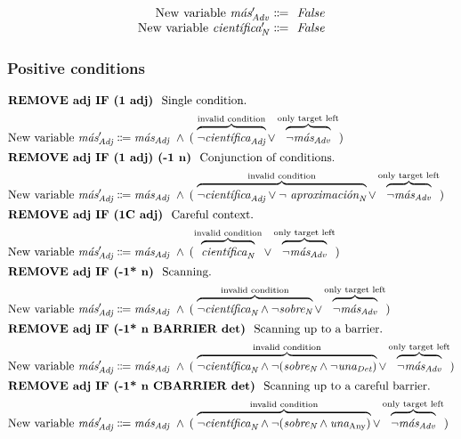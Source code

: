 \begin{equation}
\begin{array}{r @{~\eqdef~} l}
    \text{New variable } \mas{}'_\adv      & \text{ \em False} \\
    \text{New variable } \cientifica{}'_\n & \text{ \em False} \\
\end{array}
\label{eq:slAdjOrdered}
\end{equation}



\subsubsection{Positive conditions}

\def\invConds{\text{invalid condition}}
\def\onlyTrgLeft{\text{only target left}}

\begin{align}
%
\intertext{\cgrule{REMOVE adj IF (1 adj)} Single condition.} 
\text{New variable } \mas{}'_\adj 
      & \eqdef \masAdj\ 
        \wedge\: ( \; \ob{\neg\cientificaAdj}^{\invConds} 
        \vee  \ob{\neg\masAdv}^{\onlyTrgLeft} ) \\
%
%
\intertext{\cgrule{REMOVE adj IF (1 adj) (-1 n)} Conjunction of conditions.}
\text{New variable } \mas{}'_\adj 
      & \eqdef \masAdj\ 
       \wedge\: ( \; \ob{\neg\cientificaAdj \vee \neg\aproximacionN}^{\invConds} 
       \vee  \ob{\neg\masAdv}^{\onlyTrgLeft} ) \\
%
%
\intertext{\cgrule{REMOVE adj IF (1C adj)} Careful context.} %
  \text{New variable } \mas{}'_\adj 
     & \eqdef \masAdj\ 
     \wedge\: ( \ob{\cientificaN}^{\invConds} 
     \vee \ob{\neg\masAdv}^{\onlyTrgLeft}  ) \\
%
%
\intertext{\cgrule{REMOVE adj IF (-1* n)} Scanning.}
  \text{New variable } \mas{}'_\adj 
     & \eqdef \masAdj\ 
     \wedge\: ( \; \ob{\neg\cientificaN \wedge \neg\sobreN}^{\invConds} 
     \vee \ob{\neg\masAdv}^{\onlyTrgLeft} ) \\
%
%
\intertext{\cgrule{REMOVE adj IF (-1* n BARRIER det)} Scanning up to a barrier. }
  \text{New variable } \mas{}'_\adj 
     & \eqdef \masAdj\ 
     \wedge\: ( \; \ob{\neg\cientificaN \wedge \neg(\sobreN \wedge \neg\unaDet)}^{\invConds} 
     \vee \ob{\neg\masAdv}^{\onlyTrgLeft} )  \\
%
%
\intertext{\cgrule{REMOVE adj IF (-1* n CBARRIER det)} Scanning up to a careful barrier. }
  \text{New variable } \mas{}'_\adj 
     & \eqdef \masAdj\ 
     \wedge\: ( \; \ob{\neg\cientificaN \wedge \neg(\sobreN \wedge \unaAny)}^{\invConds} 
     \vee \ob{\neg\masAdv}^{\onlyTrgLeft} ) 
\end{align}



